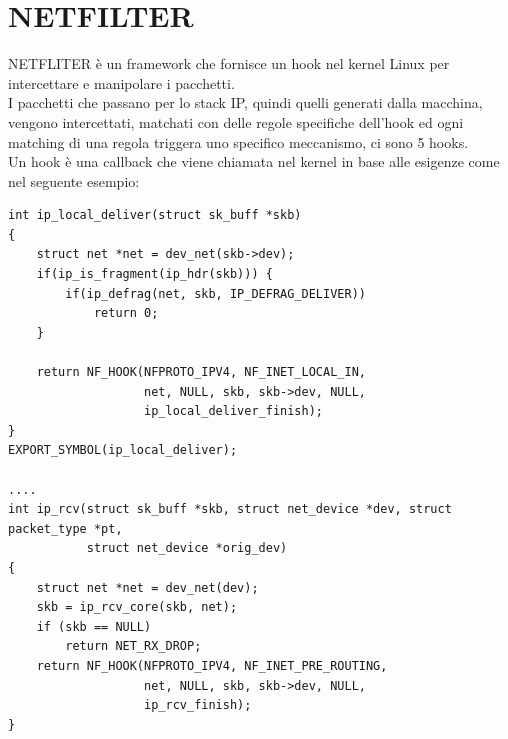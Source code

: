\documentclass[12pt, oneside]{extbook} %
\begin{document}
\section{NETFILTER}
NETFLITER è un framework che fornisce un hook nel kernel Linux per intercettare e manipolare i pacchetti.
\\I pacchetti che passano per lo stack IP, quindi quelli generati dalla macchina, vengono intercettati, matchati con delle regole specifiche dell'hook ed ogni matching di una regola triggera uno specifico meccanismo, ci sono 5 hooks.
\\Un hook è una callback che viene chiamata nel kernel in base alle esigenze come nel seguente esempio:
\begin{lstlisting}
int ip_local_deliver(struct sk_buff *skb)
{
    struct net *net = dev_net(skb->dev);
    if(ip_is_fragment(ip_hdr(skb))) {
        if(ip_defrag(net, skb, IP_DEFRAG_DELIVER))
            return 0;
    }

    return NF_HOOK(NFPROTO_IPV4, NF_INET_LOCAL_IN,
                   net, NULL, skb, skb->dev, NULL,
                   ip_local_deliver_finish);
}
EXPORT_SYMBOL(ip_local_deliver);

....
int ip_rcv(struct sk_buff *skb, struct net_device *dev, struct packet_type *pt,
           struct net_device *orig_dev)
{
    struct net *net = dev_net(dev);
    skb = ip_rcv_core(skb, net);
    if (skb == NULL)
        return NET_RX_DROP;
    return NF_HOOK(NFPROTO_IPV4, NF_INET_PRE_ROUTING,
                   net, NULL, skb, skb->dev, NULL,
                   ip_rcv_finish);
}
\end{lstlisting}
\end{document}
